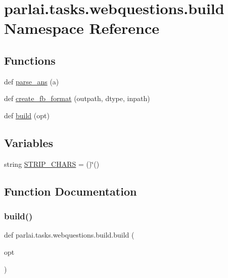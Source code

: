 \hypertarget{namespaceparlai_1_1tasks_1_1webquestions_1_1build}{}\section{parlai.\+tasks.\+webquestions.\+build Namespace Reference}
\label{namespaceparlai_1_1tasks_1_1webquestions_1_1build}
\subsection*{Functions}
\begin{DoxyCompactItemize}
\item 
def \hyperlink{namespaceparlai_1_1tasks_1_1webquestions_1_1build_a969c68eeef096e477def172c88928eb3}{parse\+\_\+ans} (a)
\item 
def \hyperlink{namespaceparlai_1_1tasks_1_1webquestions_1_1build_aba751402cc3a79acbe7517832498a7e6}{create\+\_\+fb\+\_\+format} (outpath, dtype, inpath)
\item 
def \hyperlink{namespaceparlai_1_1tasks_1_1webquestions_1_1build_a175826dcfcbe18189c4c668b1b335239}{build} (opt)
\end{DoxyCompactItemize}
\subsection*{Variables}
\begin{DoxyCompactItemize}
\item 
string \hyperlink{namespaceparlai_1_1tasks_1_1webquestions_1_1build_a199339b3ddbfe999e55a41d81af81def}{S\+T\+R\+I\+P\+\_\+\+C\+H\+A\+RS} = \textquotesingle{} ()\char`\"{}()\textquotesingle{}
\end{DoxyCompactItemize}


\subsection{Function Documentation}
\mbox{\label{namespaceparlai_1_1tasks_1_1webquestions_1_1build_a175826dcfcbe18189c4c668b1b335239}} 
\subsubsection{\texorpdfstring{build()}{build()}}
{\footnotesize\ttfamily def parlai.\+tasks.\+webquestions.\+build.\+build (\begin{DoxyParamCaption}\item[{}]{opt }\end{DoxyParamCaption})}



